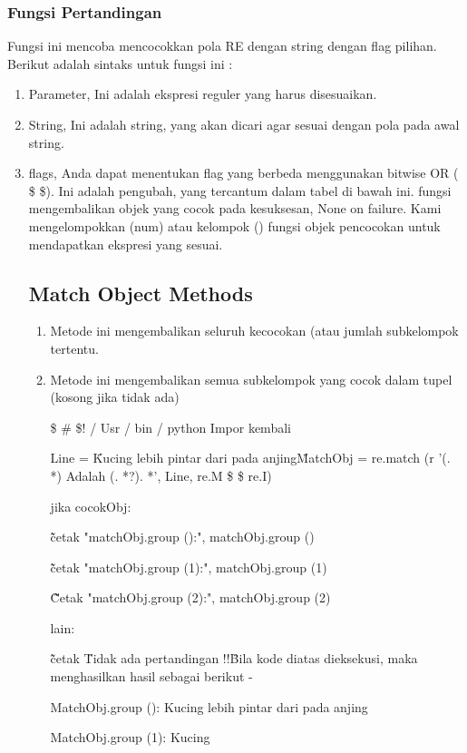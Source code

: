 \subsubsection {Fungsi Pertandingan}
Fungsi ini mencoba mencocokkan pola RE dengan string dengan flag pilihan.
Berikut adalah sintaks untuk fungsi ini :
\begin {enumerate}
\item Parameter, Ini adalah ekspresi reguler yang harus disesuaikan.
\item String, Ini adalah string, yang akan dicari agar sesuai dengan pola pada awal string.
\item flags, Anda dapat menentukan flag yang berbeda menggunakan bitwise OR ( \$ \$). Ini adalah pengubah, yang tercantum dalam tabel di bawah ini. fungsi mengembalikan objek yang cocok pada kesuksesan, None on failure. Kami mengelompokkan (num) atau kelompok () fungsi objek pencocokan untuk mendapatkan ekspresi yang sesuai.

\subsection {Match Object Methods}
\begin {enumerate}
\item Metode ini mengembalikan seluruh kecocokan (atau jumlah subkelompok tertentu.
\item Metode ini mengembalikan semua subkelompok yang cocok dalam tupel (kosong jika tidak ada)

 \$  \#  \$! / Usr / bin / python
Impor kembali

Line = \"Kucing lebih pintar dari pada anjing\"

MatchObj = re.match (r '(. *) Adalah (. *?). *', Line, re.M  \$    \$ re.I)

jika cocokObj:

\~\~ cetak "matchObj.group ():", matchObj.group ()

\~\~ cetak "matchObj.group (1):", matchObj.group (1)

\~\~ Cetak "matchObj.group (2):", matchObj.group (2)

lain:

\~\~ cetak \"Tidak ada pertandingan !!\"

Bila kode diatas dieksekusi, maka menghasilkan hasil sebagai berikut -

MatchObj.group (): Kucing lebih pintar dari pada anjing

MatchObj.group (1): Kucing


\end{enumerate}
\end{enumerate}
